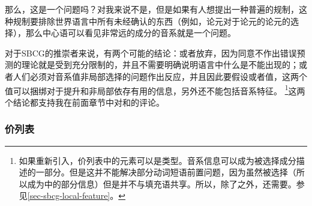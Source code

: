 那么，这是一个问题吗？对我来说不是，但是如果有人想提出一种普遍的规制，这种规制要排除世界语言中所有未经确认的东西（例如，论元对于论元的论元的选择），那么中心语可以看见非常远的成分的音系就是一个问题。

对于SBCG的推崇者来说，有两个可能的结论：或者放弃\motherfc，因为同意不作出错误预测的理论就是受到充分限制的，并且不需要明确说明语言中什么是不能出现的；或者人们必须对音系值非局部选择的问题作出反应，并且因此要假设\synsemc 或者\localfc 值，这两个值可以捆绑对于提升和非局部依存有用的信息，另外还不能包括音系特征。 \footnote{%
如果重新引入\synsemc，价列表中的元素可以是类型。音系信息可以成为被选择成分描述的一部分。但是这并不能解决部分动词短语前置问题，因为\lexfc 虽然被选择（所以成为\synsemc 中的部分信息）但是并不与填充语共享。所以，除了\synsemc 之外，还需要\localfc。参见\ref{sec-sbcg-local-feature}。
}这两个结论都支持我在前面章节中对\motherc 和\localc 的评论。

\subsubsection{价列表}
\label{sec-valence-feature-sbcg}

